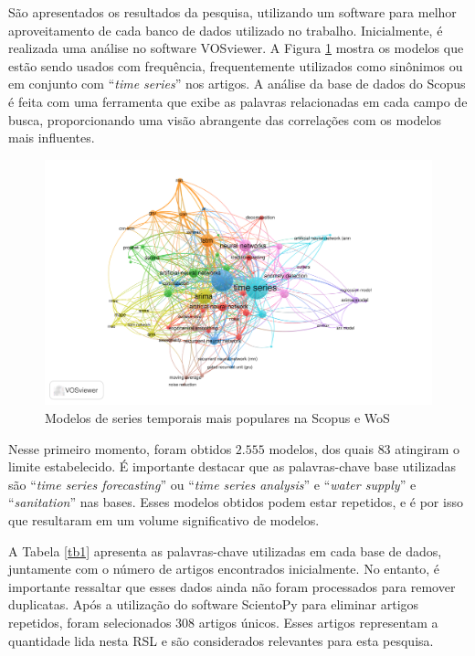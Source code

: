 São apresentados os resultados da pesquisa, utilizando um software para melhor aproveitamento de cada banco de dados utilizado no trabalho. Inicialmente, é realizada uma análise no software VOSviewer.
A Figura \ref{fig:scopus-09-08} mostra os modelos que estão sendo usados com frequência, frequentemente utilizados como sinônimos ou em conjunto com ``\textit{time series}'' nos artigos. A análise da base de dados do Scopus é feita com uma ferramenta que exibe as palavras relacionadas em cada campo de busca, proporcionando uma visão abrangente das correlações com os modelos mais influentes.

\begin{figure}[H]
	\centering
	\caption{Modelos de series temporais mais populares na Scopus e WoS }
	\label{fig:scopus-09-08}
	\includegraphics[width=\linewidth]{Revisao/Figuras/base-wos-scopus}
	
\end{figure}

Nesse primeiro momento, foram obtidos $2.555$ modelos, dos quais $83$ atingiram o limite estabelecido. É importante destacar que as palavras-chave base utilizadas são ``\textit{time series forecasting}'' ou ``\textit{time series analysis}'' e ``\textit{water supply}'' e ``\textit{sanitation}'' nas bases. Esses modelos obtidos podem estar repetidos, e é por isso que resultaram em um volume significativo de modelos.


A Tabela \ref{tb1} apresenta as palavras-chave utilizadas em cada base de dados, juntamente com o número de artigos encontrados inicialmente. No entanto, é importante ressaltar que esses dados ainda não foram processados para remover duplicatas. Após a utilização do software ScientoPy \cite{scientopy} para eliminar artigos repetidos, foram selecionados $308$ artigos únicos. Esses artigos representam a quantidade lida nesta RSL e são considerados relevantes para esta pesquisa.


